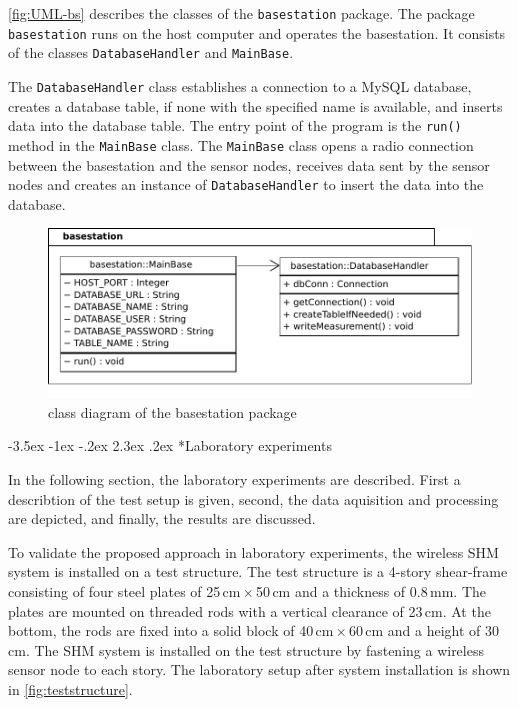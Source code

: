 \documentclass[12pt,a4paper]{scrartcl}
\makeatletter
\renewcommand\section{\@startsection{section}{1}{\z@}%
                     {-3.5ex \@plus -1ex \@minus -.2ex}%
                     {2.3ex \@plus.2ex}%
                     {\normalfont\large\bfseries}}
\makeatother
\begin{document}
\autoref{fig:UML-bs} describes the classes of the \texttt{base\-station} package.
The package \texttt{base\-station} runs on the host computer and operates the basestation.
It consists of the classes \texttt{Database\-Handler} and \texttt{Main\-Base}.

The \texttt{Database\-Handler} class establishes a connection to a MySQL database, creates a database table, if none with the specified name is available, and inserts data into the database table.
The entry point of the program is the \texttt{run()} method in the \texttt{Main\-Base} class. The \texttt{Main\-Base} class opens a radio connection between the basestation and the sensor nodes, receives data sent by the sensor nodes and creates an instance of \texttt{Database\-Handler} to insert the data into the database.

\begin{figure}[h!]
    \centering
    \includegraphics[width = \textwidth]{figures/uml-basestation.pdf}
    \caption{class diagram of the basestation package}
    \label{fig:UML-bs}
\end{figure}



\section*{Laboratory experiments}

In the following section, the laboratory experiments are described.
First a describtion of the test setup is given, second, the data aquisition and processing are depicted, and finally, the results are discussed. 

To validate the proposed approach in laboratory experiments, the wireless SHM system is installed on a test structure.
The test structure is a 4-story shear-frame consisting of four steel plates of 25\,cm\,$\times$\,50\,cm and a thickness of 0.8\,mm.
The plates are mounted on threaded rods with a vertical clearance of 23\,cm.
At the bottom, the rods are fixed into a solid block of 40\,cm\,$\times$\,60\,cm and a height of 30\,cm.
The SHM system is installed on the test structure by fastening a wireless sensor node to each story.
The laboratory setup after system installation is shown in \autoref{fig:teststructure}.
\end{document}
